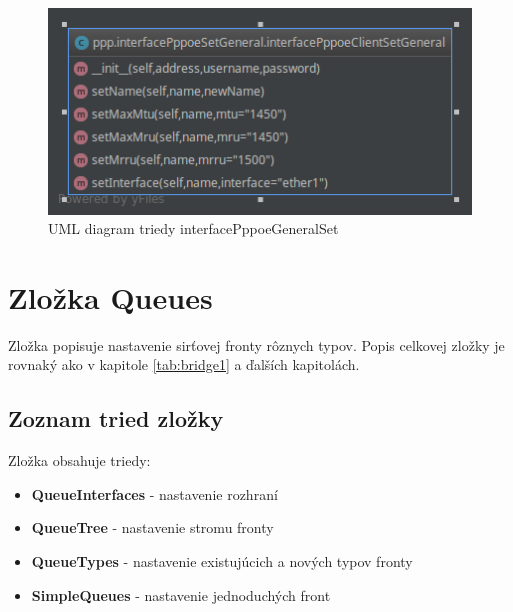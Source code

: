 \begin{figure}[H]
\centering
\includegraphics[scale=0.6]{../text/ppptab.png}
\caption{UML diagram triedy interfacePppoeGeneralSet}
\label{fig:pppset}
\end{figure}
\section{Zložka Queues}
Zložka popisuje nastavenie sirťovej fronty rôznych typov. Popis celkovej zložky je rovnaký ako v kapitole \ref{tab:bridge1} a ďalších kapitolách.
\subsection{Zoznam tried zložky}
Zložka obsahuje triedy:
\begin{itemize}
\item \textbf{QueueInterfaces} - nastavenie rozhraní
\item \textbf{QueueTree} - nastavenie stromu fronty
\item \textbf{QueueTypes} - nastavenie existujúcich a nových typov fronty
\item \textbf{SimpleQueues} - nastavenie jednoduchých front
\end{itemize}
